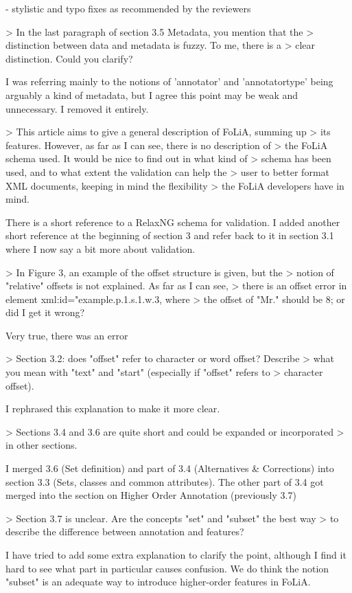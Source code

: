- stylistic and typo fixes as recommended by the reviewers




> In the last paragraph of section 3.5 Metadata, you mention that the
> distinction between data and metadata is fuzzy. To me, there is a
> clear distinction. Could you clarify?

I was referring mainly to the notions of 'annotator' and 'annotatortype' being arguably a kind of metadata, but I agree this point may be weak and unnecessary. I removed it entirely.

> This article aims to give a general description of FoLiA, summing up
> its features. However, as far as I can see, there is no description of
> the FoLiA schema used. It would be nice to find out in what kind of
> schema has been used, and to what extent the validation can help the
> user to better format XML documents, keeping in mind the flexibility
> the FoLiA developers have in mind.

There is a short reference to a RelaxNG schema for validation. I added another
short reference at the beginning of section 3 and refer back to it in section
3.1 where I now say a bit more about validation. 

> In Figure 3, an example of the offset structure is given, but the
> notion of "relative" offsets is not explained. As far as I can see,
> there is an offset error in element xml:id="example.p.1.s.1.w.3, where
> the offset of "Mr." should be 8; or did I get it wrong?

Very true, there was an error

> Section 3.2: does "offset" refer to character or word offset? Describe
> what you mean with "text" and "start" (especially if "offset" refers to
> character offset).

I rephrased this explanation to make it more clear.

> Sections 3.4 and 3.6 are quite short and could be expanded or incorporated
> in other sections.

I merged 3.6 (Set definition) and part of 3.4 (Alternatives & Corrections) into
section 3.3 (Sets, classes and common attributes). The other part of 3.4 got
merged into the section on Higher Order Annotation (previously 3.7)

> Section 3.7 is unclear. Are the concepts "set" and "subset" the best way
> to describe the difference between annotation and features?

I have tried to add some extra explanation to clarify the point, although I
find it hard to see what part in particular causes confusion. 
We do think the notion "subset" is an adequate way to introduce higher-order
features in FoLiA.





